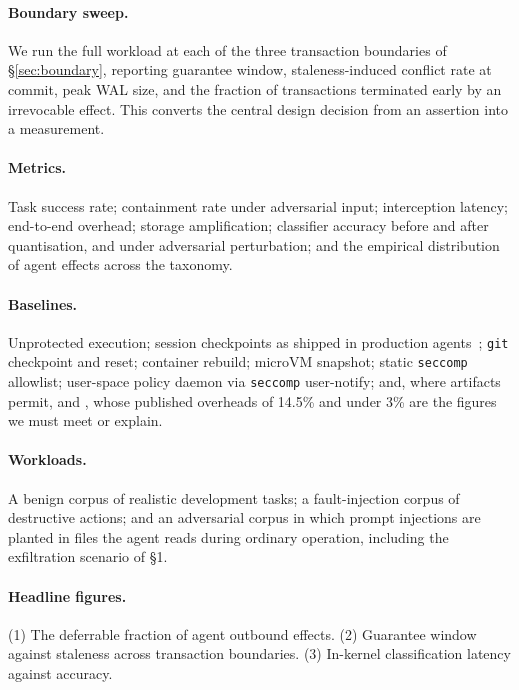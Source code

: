 \documentclass[10pt,twocolumn]{article}
\begin{document}
\paragraph{Boundary sweep.} We run the full workload at each of the three
transaction boundaries of \S\ref{sec:boundary}, reporting guarantee window,
staleness-induced conflict rate at commit, peak WAL size, and the fraction of
transactions terminated early by an irrevocable effect. This converts the
central design decision from an assertion into a measurement.

\paragraph{Metrics.} Task success rate; containment rate under adversarial
input; interception latency; end-to-end overhead; storage amplification;
classifier accuracy before and after quantisation, and under adversarial
perturbation; and the empirical distribution of agent effects across the
taxonomy.

\paragraph{Baselines.} Unprotected execution; session checkpoints as shipped in
production agents~\cite{ccrewind}; \texttt{git} checkpoint and reset; container
rebuild; microVM snapshot; static \texttt{seccomp} allowlist; user-space policy
daemon via \texttt{seccomp} user-notify; and, where artifacts permit,
\cite{ftsandbox2025} and \cite{deltabox2026}, whose published overheads of
14.5\% and under 3\% are the figures we must meet or explain.

\paragraph{Workloads.} A benign corpus of realistic development tasks; a
fault-injection corpus of destructive actions; and an adversarial corpus in
which prompt injections are planted in files the agent reads during ordinary
operation, including the exfiltration scenario of \S1.

\paragraph{Headline figures.} (1) The deferrable fraction of agent outbound
effects. (2) Guarantee window against staleness across transaction boundaries.
(3) In-kernel classification latency against accuracy.
\end{document}
